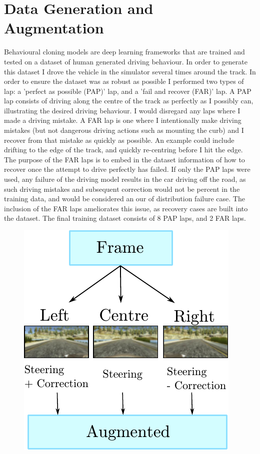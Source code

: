 \documentclass[letterpaper,12pt]{article}
\begin{document}
\section{Data Generation and Augmentation}
Behavioural cloning models are deep learning frameworks that are trained and tested on a dataset of human generated driving behaviour. In order to generate this dataset I drove the vehicle in the simulator several times around the track. In order to ensure the dataset was as robust as possible I performed two types of lap: a 'perfect as possible (PAP)' lap, and a 'fail and recover (FAR)' lap. A PAP lap consists of driving along the centre of the track as perfectly as I possibly can, illustrating the desired driving behaviour. I would disregard any laps where I made a driving mistake. A FAR lap is one where I intentionally make driving mistakes (but not dangerous driving actions such as mounting the curb) and I recover from that mistake as quickly as possible. An example could include drifting to the edge of the track, and quickly re-centring before I hit the edge. The purpose of the FAR laps is to embed in the dataset information of how to recover once the attempt to drive perfectly has failed. If only the PAP laps were used, any failure of the driving model results in the car driving off the road, as such driving mistakes and subsequent correction would not be percent in the training data, and would be considered an our of distribution failure case. The inclusion of the FAR laps ameliorates this issue, as recovery cases are built into the dataset. The final training dataset consists of 8 PAP laps, and 2 FAR laps.
\FloatBarrier
\begin{figure}
\centering
\includegraphics[scale=1.5]{results/augment.pdf}
\end{figure}
\end{document}
